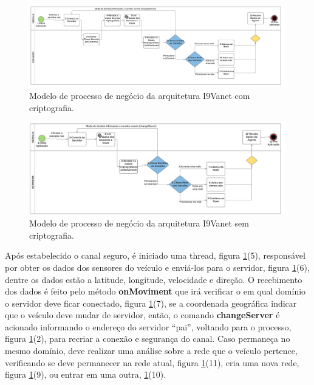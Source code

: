\documentclass[
	12pt,				%
	oneside,			%
	a4paper,			%
	english,			%
	brazil				%
	]{abntex2ppgsi}
\begin{document}
\begin{figure}[h!]
	\centering
	\includegraphics[width=1.0\columnwidth]{images/BPMCriptofrafado.png}
	\caption{Modelo de processo de negócio da arquitetura I9Vanet com criptografia.}
	\label{fig:bpmcriptografia}
\end{figure}

\begin{figure}[h!]
	\centering
	\includegraphics[width=0.9\columnwidth]{images/BPM.png}
	\caption{Modelo de processo de negócio da arquitetura I9Vanet sem criptografia.}
	\label{fig:bpm}
\end{figure}

Após estabelecido o canal seguro, é iniciado uma thread, figura \ref{fig:bpmcriptografia}(5), responsável por obter os dados dos sensores do veículo e enviá-los para o servidor, figura \ref{fig:bpmcriptografia}(6), dentre os dados estão a latitude, longitude, velocidade e direção. O recebimento dos dados é feito pelo método \textbf{onMoviment} que irá verificar o em qual domínio o servidor deve ficar conectado, figura \ref{fig:bpmcriptografia}(7), se a coordenada geográfica indicar que o veículo deve mudar de servidor, então, o comando \textbf{changeServer} é acionado informando o endereço do servidor ``pai'', voltando para o processo, figura \ref{fig:bpmcriptografia}(2), para recriar a conexão e segurança do canal. Caso permaneça no mesmo domínio, deve realizar uma análise sobre a rede que o veículo pertence, verificando se deve permanecer na rede atual, figura  \ref{fig:bpmcriptografia}(11), cria uma  nova rede, figura \ref{fig:bpmcriptografia}(9), ou entrar em uma outra,  \ref{fig:bpmcriptografia}(10).
\end{document}
